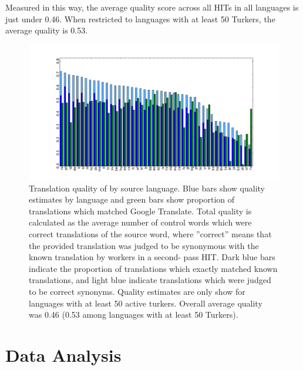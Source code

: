 \documentclass[11pt]{article}
\begin{document}
Measured in this way, the average quality score across all HITs in all languages is just under 0.46. When restricted to languages with at least 50 Turkers, the average quality is 0.53. 

\begin{figure}[h]
\centering
\includegraphics[height=\linewidth,angle=270]{final-figures/google-match-bar}
\caption{Translation quality of by source language. Blue bars show quality estimates by language and green bars show proportion of translations which matched Google Translate. Total quality is calculated as the average number of control words which were correct translations of the source word, where ”correct” means that the provided translation was judged to be synonymous with the known translation by workers in a second-
pass HIT. Dark blue bars indicate the proportion of translations which exactly matched known translations, and light blue indicate translations which were judged to be correct synonyms. Quality estimates are only show for languages with at least 50 active turkers. Overall average quality was 0.46 (0.53 among languages with at least 50 Turkers).}
\label{hitlangqual}
\end{figure}

\section{Data Analysis}
\end{document}
